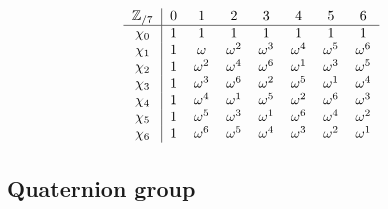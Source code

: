 \begin{align*}
  & \begin{tabular}{c|ccccccc}
    $\mathbb{Z}_{/7}$ & $0$ & $1$ & $2$ & $3$ & $4$ & $5$ & $6$ \\
    \hline
    $\chi_{0}$ & $1$ & $1$ & $1$ & $1$ & $1$ & $1$ & $1$ \\
    $\chi_{1}$ & $1$ & $\omega$ & $\omega^2$ & $\omega^3$ & $\omega^4$ & $\omega^5$ & $\omega^6$ \\
    $\chi_{2}$ & $1$ & $\omega^2$ & $\omega^4$ & $\omega^6$ & $\omega^1$ & $\omega^3$ & $\omega^5$ \\
    $\chi_{3}$ & $1$ & $\omega^3$ & $\omega^6$ & $\omega^2$ & $\omega^5$ & $\omega^1$ & $\omega^4$ \\
    $\chi_{4}$ & $1$ & $\omega^4$ & $\omega^1$ & $\omega^5$ & $\omega^2$ & $\omega^6$ & $\omega^3$ \\
    $\chi_{5}$ & $1$ & $\omega^5$ & $\omega^3$ & $\omega^1$ & $\omega^6$ & $\omega^4$ & $\omega^2$ \\
    $\chi_{6}$ & $1$ & $\omega^6$ & $\omega^5$ & $\omega^4$ & $\omega^3$ & $\omega^2$ & $\omega^1$ \\
  \end{tabular}
\end{align*}

\subsection{Quaternion group} %
\pan {}

